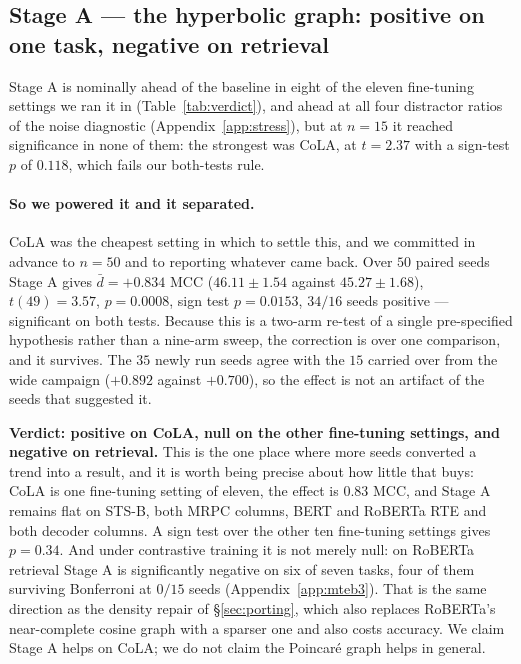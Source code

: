 \documentclass{article}
\begin{document}
\subsection{Stage A --- the hyperbolic graph: positive on one task, negative on retrieval}
\label{sec:stageA}

Stage A is nominally ahead of the baseline in eight of the eleven fine-tuning
settings we ran it in (Table~\ref{tab:verdict}), and ahead at all four
distractor ratios of the noise diagnostic (Appendix~\ref{app:stress}), but at
$n=15$ it reached significance in none of them: the strongest was CoLA, at
$t=2.37$ with a sign-test $p$ of $0.118$, which fails our both-tests rule.

\paragraph{So we powered it and it separated.} CoLA was the cheapest setting in
which to settle this, and we committed in advance to $n=50$ and to reporting
whatever came back. Over $50$ paired seeds Stage A gives $\bar{d}=+0.834$ MCC
($46.11 \pm 1.54$ against $45.27 \pm 1.68$), $t(49)=3.57$, $p=0.0008$, sign test
$p=0.0153$, $34/16$ seeds positive --- significant on both tests. Because this
is a two-arm re-test of a single pre-specified hypothesis rather than a nine-arm
sweep, the correction is over one comparison, and it survives. The $35$ newly
run seeds agree with the $15$ carried over from the wide campaign ($+0.892$
against $+0.700$), so the effect is not an artifact of the seeds that suggested
it.

\textbf{Verdict: positive on CoLA, null on the other fine-tuning settings, and
negative on retrieval.} This is the one place where more seeds converted a trend
into a result, and it is worth being precise about how little that buys: CoLA is
one fine-tuning setting of eleven, the effect is $0.83$ MCC, and Stage A remains
flat on STS-B, both MRPC columns, BERT and RoBERTa RTE and both decoder columns.
A sign test over the other ten fine-tuning settings gives $p=0.34$. And under
contrastive training it is not merely null: on RoBERTa retrieval Stage A is
significantly negative on six of seven tasks, four of them surviving Bonferroni
at $0/15$ seeds (Appendix~\ref{app:mteb3}). That is the same direction as the
density repair of \S\ref{sec:porting}, which also replaces RoBERTa's
near-complete cosine graph with a sparser one and also costs accuracy. We claim
Stage A helps on CoLA; we do not claim the Poincar\'e graph helps in general.
\end{document}
